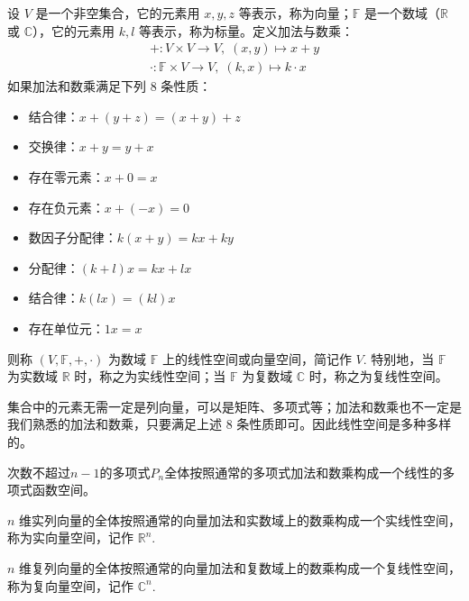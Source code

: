 \begin{definition}
设 $V$ 是一个非空集合，它的元素用 $x,y,z$ 等表示，称为向量；$\mathbb F$ 是一个数域（$\mathbb R$ 或 $\mathbb C$），它的元素用 $k,l$ 等表示，称为标量。定义加法与数乘：
\begin{gather*}
    +:V\times V\to V,\;(x,y)\mapsto x+y\\
    \cdot:\mathbb F\times V\to V,\;(k,x)\mapsto k\cdot x
\end{gather*}
如果加法和数乘满足下列 8 条性质：
\begin{itemize}
    \item 结合律：$x+(y+z)=(x+y)+z$
    \item 交换律：$x+y=y+x$
    \item 存在零元素：$x+0=x$
    \item 存在负元素：$x+(-x)=0$
    \item 数因子分配律：$k(x+y)=kx+ky$
    \item 分配律：$(k+l)x=kx+lx$
    \item 结合律：$k(lx)=(kl)x$
    \item 存在单位元：$1x=x$
\end{itemize}
则称 $(V,\mathbb F,+,\cdot)$ 为数域 $\mathbb F$ 上的线性空间或向量空间，简记作 $V$. 特别地，当 $\mathbb F$ 为实数域 $\mathbb R$ 时，称之为实线性空间；当 $\mathbb F$ 为复数域 $\mathbb C$ 时，称之为复线性空间。
\end{definition}

\begin{remark}
集合中的元素无需一定是列向量，可以是矩阵、多项式等；加法和数乘也不一定是我们熟悉的加法和数乘，只要满足上述 8 条性质即可。因此线性空间是多种多样的。
\end{remark}

\begin{example}
\label{ex:linearspace-pn}
次数不超过$n−1$的多项式$P_n$全体按照通常的多项式加法和数乘构成一个线性的多项式函数空间。
\end{example}

\begin{example}
\label{ex:linearspace-rn}
$n$ 维实列向量的全体按照通常的向量加法和实数域上的数乘构成一个实线性空间，称为实向量空间，记作 $\mathbb R^n$.
\end{example}

\begin{example}
\label{ex:linearspace-cn}
$n$ 维复列向量的全体按照通常的向量加法和复数域上的数乘构成一个复线性空间，称为复向量空间，记作 $\mathbb C^n$.
\end{example}

